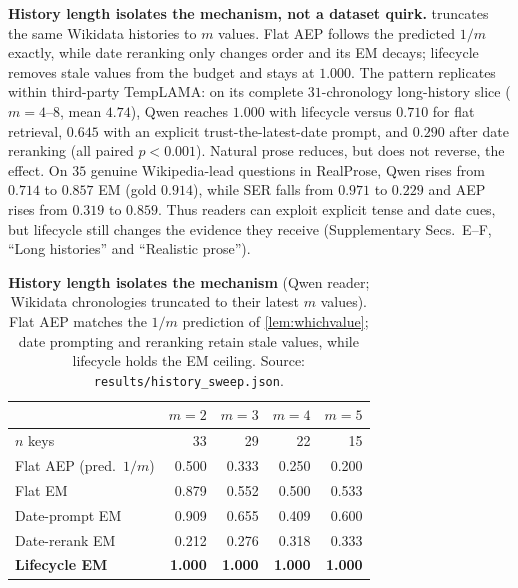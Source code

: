 \documentclass[letterpaper]{article}
\theoremstyle{plain}
\begin{document}
\noindent\textbf{History length isolates the mechanism, not a dataset quirk.}  truncates the same Wikidata histories to $m$ values. Flat AEP follows the predicted $1/m$ exactly, while date reranking only changes order and its EM decays; lifecycle removes stale values from the budget and stays at $1.000$. The pattern replicates within third-party TempLAMA: on its complete $31$-chronology long-history slice ($m{=}4$--$8$, mean $4.74$), Qwen reaches $1.000$ with lifecycle versus $0.710$ for flat retrieval, $0.645$ with an explicit trust-the-latest-date prompt, and $0.290$ after date reranking (all paired $p<0.001$). Natural prose reduces, but does not reverse, the effect. On $35$ genuine Wikipedia-lead questions in RealProse, Qwen rises from $0.714$ to $0.857$ EM (gold $0.914$), while SER falls from $0.971$ to $0.229$ and AEP rises from $0.319$ to $0.859$. Thus readers can exploit explicit tense and date cues, but lifecycle still changes the evidence they receive (Supplementary Secs.~E--F, ``Long histories'' and ``Realistic prose'').

\begin{table}[t]
\centering
\footnotesize
\begin{tabular*}{\columnwidth}{@{\extracolsep{\fill}}lrrrr@{}}
\toprule
 & $m{=}2$ & $m{=}3$ & $m{=}4$ & $m{=}5$ \\
\midrule
$n$ keys & 33 & 29 & 22 & 15 \\
Flat AEP (pred.\ $1/m$) & 0.500 & 0.333 & 0.250 & 0.200 \\
Flat EM & 0.879 & 0.552 & 0.500 & 0.533 \\
Date-prompt EM & 0.909 & 0.655 & 0.409 & 0.600 \\
Date-rerank EM & 0.212 & 0.276 & 0.318 & 0.333 \\
\textbf{Lifecycle EM} & \textbf{1.000} & \textbf{1.000} & \textbf{1.000} & \textbf{1.000} \\
\bottomrule
\end{tabular*}
\caption{\textbf{History length isolates the mechanism} (Qwen reader; Wikidata chronologies truncated to their latest $m$ values). Flat AEP matches the $1/m$ prediction of \cref{lem:whichvalue}; date prompting and reranking retain stale values, while lifecycle holds the EM ceiling. Source: \texttt{results/history\_sweep.json}.}
\label{tab:msweep}
\end{table}



\end{document}
